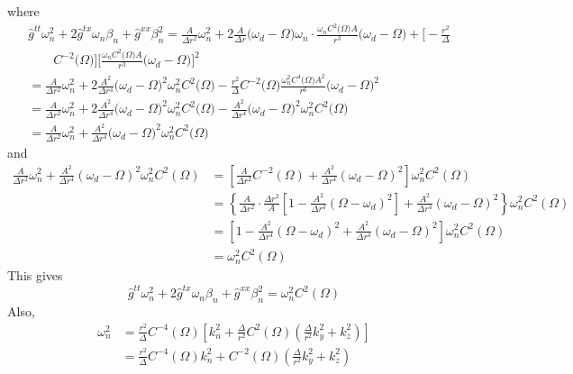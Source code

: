 \documentclass[english]{article}
\begin{document}
 where 
\begin{align*}
 & \hat{g}^{tt}\omega^{2}_{n}+2\hat{g}^{tx}\omega_{n}\beta_{n}+\hat{g}^{xx}\beta^{2}_{n}=\frac{A}{\Delta r^{2}}\omega^{2}_{n}+2\frac{A}{\Delta r}\biggl(\omega_{d}-\Omega\biggr)\omega_{n}\cdot\frac{\omega_{n}C^{2}\biggl(\Omega\biggr)A}{r^{3}}\biggl(\omega_{d}-\Omega\biggr)+\biggl[-\frac{r^{2}}{\Delta}\\
 & \qquad C^{-2}\biggl(\Omega\biggr)\biggr]\biggl[\frac{\omega_{n}C^{2}\biggl(\Omega\biggr)A}{r^{3}}\biggl(\omega_{d}-\Omega\biggr)\biggr]^{2}\\
 & =\frac{A}{\Delta r^{2}}\omega^{2}_{n}+2\frac{A^{2}}{\Delta r^{4}}\biggl(\omega_{d}-\Omega\biggr)^{2}\omega^{2}_{n}C^{2}\biggl(\Omega\biggr)-\frac{r^{2}}{\Delta}C^{-2}\biggl(\Omega\biggr)\frac{\omega^{2}_{n}C^{4}\biggl(\Omega\biggr)A^{2}}{r^{6}}\biggl(\omega_{d}-\Omega\biggr)^{2}\\
 & =\frac{A}{\Delta r^{2}}\omega^{2}_{n}+2\frac{A^{2}}{\Delta r^{4}}\biggl(\omega_{d}-\Omega\biggr)^{2}\omega^{2}_{n}C^{2}\biggl(\Omega\biggr)-\frac{A^{2}}{\Delta r^{4}}\biggl(\omega_{d}-\Omega\biggr)^{2}\omega^{2}_{n}C^{2}\biggl(\Omega\biggr)\\
 & =\frac{A}{\Delta r^{2}}\omega^{2}_{n}+\frac{A^{2}}{\Delta r^{4}}\biggl(\omega_{d}-\Omega\biggr)^{2}\omega^{2}_{n}C^{2}\biggl(\Omega\biggr)
\end{align*}
 and 
\begin{align*}
\frac{A}{\Delta r^{2}}\omega^{2}_{n}+\frac{A^{2}}{\Delta r^{4}}\left(\omega_{d}-\Omega\right)^{2}\omega^{2}_{n}C^{2}\left(\Omega\right) & =\left[\frac{A}{\Delta r^{2}}C^{-2}\left(\Omega\right)+\frac{A^{2}}{\Delta r^{4}}\left(\omega_{d}-\Omega\right)^{2}\right]\omega^{2}_{n}C^{2}\left(\Omega\right)\\
 & =\left\{ \frac{A}{\Delta r^{2}}\cdot\frac{\Delta r^{2}}{A}\left[1-\frac{A^{2}}{\Delta r^{4}}\left(\Omega-\omega_{d}\right)^{2}\right]+\frac{A^{2}}{\Delta r^{4}}\left(\omega_{d}-\Omega\right)^{2}\right\} \omega^{2}_{n}C^{2}\left(\Omega\right)\\
 & =\left[1-\frac{A^{2}}{\Delta r^{4}}\left(\Omega-\omega_{d}\right)^{2}+\frac{A^{2}}{\Delta r^{4}}\left(\omega_{d}-\Omega\right)^{2}\right]\omega^{2}_{n}C^{2}\left(\Omega\right)\\
 & =\omega^{2}_{n}C^{2}\left(\Omega\right)
\end{align*}
 This gives 
\[
\hat{g}^{tt}\omega^{2}_{n}+2\hat{g}^{tx}\omega_{n}\beta_{n}+\hat{g}^{xx}\beta^{2}_{n}=\omega^{2}_{n}C^{2}\left(\Omega\right)
\]
 Also, 
\begin{align*}
\omega^{2}_{n} & =\frac{r^{2}}{\Delta}C^{-4}\left(\Omega\right)\left[k^{2}_{n}+\frac{\Delta}{r^{2}}C^{2}\left(\Omega\right)\left(\frac{\Delta}{r^{2}}k^{2}_{y}+k^{2}_{z}\right)\right]\\
 & =\frac{r^{2}}{\Delta}C^{-4}\left(\Omega\right)k^{2}_{n}+C^{-2}\left(\Omega\right)\left(\frac{\Delta}{r^{2}}k^{2}_{y}+k^{2}_{z}\right)
\end{align*}
\end{document}
